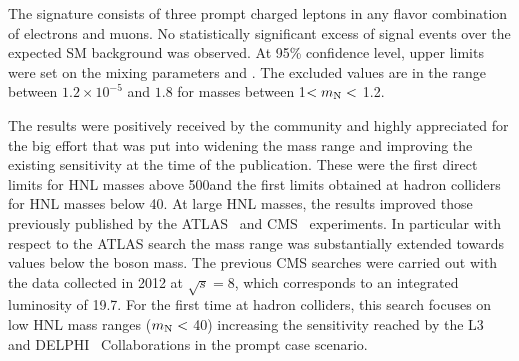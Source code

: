 The signature consists of three prompt charged leptons in any flavor combination of electrons
and muons.
No statistically significant excess of signal events over the expected
SM background was observed. At 95\% confidence level, upper limits were set on the mixing
parameters \mixpare and \mixparm. The excluded values are in the
range between $1.2\times 10^{-5}$ and $1.8$ for masses 
between 1\GeV $< m_\mathrm{N} <$ 1.2\TeV. 

The results were positively received by the community and highly appreciated
for the big effort that was put into widening the mass range and
improving the existing sensitivity at the time of the publication.
These were the first direct limits for HNL masses above 500\GeV and the first
limits obtained at hadron colliders for HNL masses below 40\GeV.
At large HNL masses, the results improved those previously published
by the ATLAS~\cite{Aad_2015} and CMS~\cite{Khachatryan_2015,Sirunyan:2018xiv}
experiments. In particular with respect to the ATLAS search the mass
range was substantially extended towards values below the \PW boson
mass. The previous CMS searches were carried out with the data
collected in 2012 at $\sqrt{s} = 8$\TeV, which corresponds to an
integrated luminosity of 19.7\fbinv. 
For the first time at hadron colliders, this search focuses on low HNL mass ranges
($ m_\mathrm{N} < $ 40\GeV) increasing the sensitivity reached by the
L3~\cite{ACHARD200167} and DELPHI~\cite{Abreu:1996pa} Collaborations
in the prompt case scenario.\\

